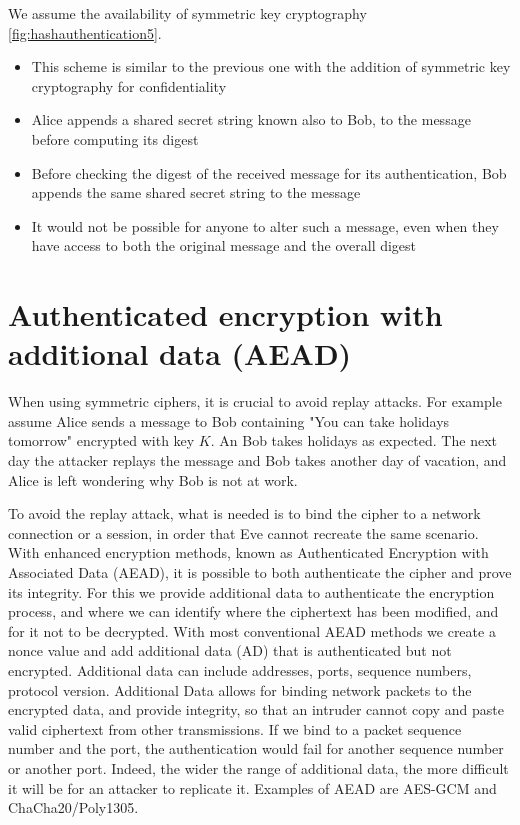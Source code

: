 We assume the availability of symmetric key cryptography \ref{fig:hashauthentication5}.
\begin{itemize}
	\item This scheme is similar to the previous one with the addition of symmetric key cryptography for confidentiality
	\item Alice appends a shared secret string known also to Bob, to the message before computing its digest
	\item Before checking the digest of the received message for its authentication, Bob appends the same shared secret string to the message
	\item It would not be possible for anyone to alter such a message, even when they have access to both the original message and the overall digest
\end{itemize}


\section{Authenticated encryption with additional data (AEAD)}

When using symmetric ciphers, it is crucial to avoid replay attacks. For example assume Alice sends a message to Bob containing "You can take holidays tomorrow" encrypted with key $K$. An Bob takes holidays as expected. The next day the attacker replays the message and Bob takes another day of vacation, and Alice is left wondering why Bob is not at work.

To avoid the replay attack, what is needed is to bind the cipher to a network connection or a session, in order that Eve cannot recreate the same scenario. With enhanced encryption methods, known as Authenticated Encryption with Associated Data (AEAD), it is possible to both authenticate the cipher and prove its integrity. For this we provide additional data to authenticate the encryption process, and where we can identify where the ciphertext has been modified, and for it not to be decrypted. With most conventional AEAD methods we create a nonce value and add additional data (AD) that is authenticated but not encrypted. Additional data can include addresses, ports, sequence numbers, protocol version.
Additional Data allows for binding network packets to the encrypted data, and provide integrity, so that an intruder cannot copy and paste valid ciphertext from other transmissions. If we bind to a packet sequence number and the port, the authentication would fail for another sequence number or another port.  Indeed, the wider the range of additional data, the more difficult it will be for an attacker to replicate it.  Examples of AEAD are AES-GCM and ChaCha20/Poly1305.


